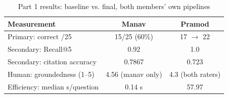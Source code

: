 \begin{table}[t]
\caption{Part 1 results: baseline vs. final, both members' own pipelines}
\label{tab:p1-results}
\centering\small
\begin{tabular}{lcc}
\toprule
Measurement & Manav & Pramod \\
\midrule
Primary: correct /25 & 15/25 (60\%) & 17 $\rightarrow$ 22 \\
Secondary: Recall@5 & 0.92 & 1.0 \\
Secondary: citation accuracy & 0.7867 & 0.723 \\
Human: groundedness (1--5) & 4.56 (manav only) & 4.3 (both raters) \\
Efficiency: median s/question & 0.14 s & 57.97 \\
\bottomrule
\end{tabular}
\end{table}
